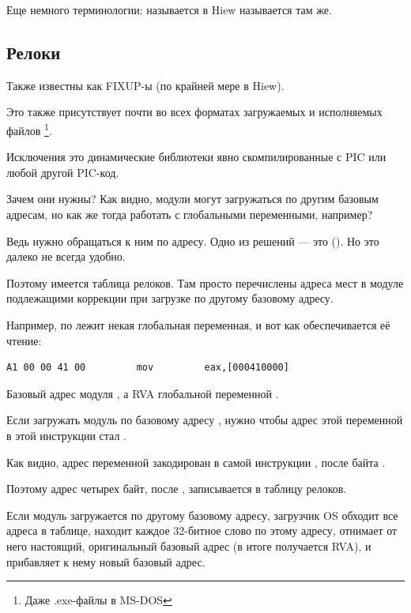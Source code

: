 Еще немного терминологии:  называется  в Hiew \AndENRU {} называется  там же.

\subsection{Релоки}
\label{subsec:relocs}

Также известны как FIXUP-ы (по крайней мере в Hiew).

Это также присутствует почти во всех форматах загружаемых и исполняемых файлов
\footnote{Даже .exe-файлы в MS-DOS}.

Исключения это динамические библиотеки явно скомпилированные с \ac{PIC} или любой другой \ac{PIC}-код.

Зачем они нужны?
Как видно, модули могут загружаться по другим базовым адресам,
но как же тогда работать с глобальными переменными, например?

Ведь нужно обращаться к ним по адресу.
Одно из решений --- это \PICcode{} ().  Но это далеко не всегда удобно.

Поэтому имеется таблица релоков. 
Там просто перечислены адреса мест в модуле подлежащими коррекции при загрузке по другому базовому адресу.

Например, по  лежит некая глобальная переменная, и вот как обеспечивается её чтение:

\begin{lstlisting}
A1 00 00 41 00         mov         eax,[000410000]
\end{lstlisting}

Базовый адрес модуля , а \ac{RVA} глобальной переменной .

Если загружать модуль по базовому адресу , нужно чтобы адрес этой переменной в этой инструкции стал .

Как видно, адрес переменной закодирован в самой инструкции , после байта .

Поэтому адрес четырех байт, после , записывается в таблицу релоков.

Если модуль загружается по другому базовому адресу,
загрузчик \ac{OS} обходит все адреса в таблице, 
находит каждое 32-битное слово по этому адресу,
отнимает от него настоящий, оригинальный базовый адрес
(в итоге получается \ac{RVA}), и прибавляет к нему новый базовый адрес.

